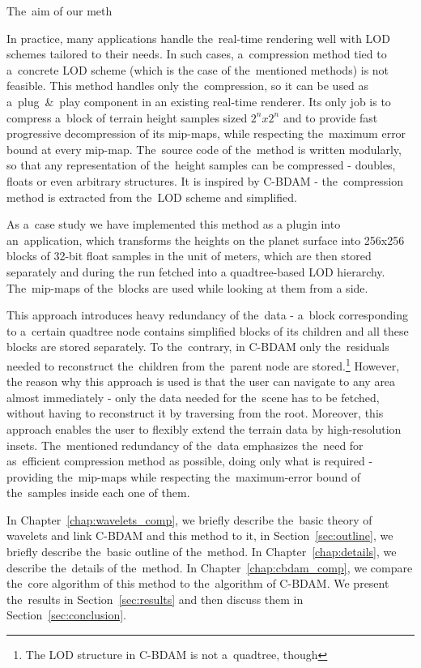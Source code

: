 The~aim of our meth

In practice, many applications handle the~real-time rendering well with LOD schemes tailored to their needs. In such cases, a~compression method tied to a~concrete LOD scheme (which is the case of the~mentioned methods) is not feasible. This method handles only the~compression, so it can be used as a~plug~\&~play component in an existing real-time renderer. Its only job is to compress a~block of terrain height samples sized $2^n x 2^n$ and to provide fast progressive decompression of its mip-maps, while respecting the~maximum error bound at every mip-map. The~source code of the~method is written modularly, so that any representation of the~height samples can be compressed - doubles, floats or even arbitrary structures. It is inspired by C-BDAM - the~compression method is extracted from the~LOD scheme and simplified.

As a~case study we have implemented this method as a plugin into an~application, which transforms the heights on the planet surface into 256x256 blocks of 32-bit float samples in the unit of meters, which are then stored separately and during the run fetched into a quadtree-based LOD hierarchy. The~mip-maps of the~blocks are used while looking at them from a side.

This approach introduces heavy redundancy of the~data - a~block corresponding to a~certain quadtree node contains simplified blocks of its children and all these blocks are stored separately. To the~contrary, in C-BDAM only the~residuals needed to reconstruct the~children from the~parent node are stored.\footnote{The LOD structure in C-BDAM is not a~quadtree, though} However, the reason why this approach is used is that the user can navigate to any area almost immediately - only the data needed for the~scene has to be fetched, without having to reconstruct it by traversing from the root. Moreover, this approach enables the user to flexibly extend the terrain data by high-resolution insets. The~mentioned redundancy of the~data emphasizes the~need for as~efficient compression method as possible, doing only what is required - providing the~mip-maps while respecting the~maximum-error bound of the~samples inside each one of them.

In Chapter~\ref{chap:wavelets_comp}, we briefly describe the~basic theory of wavelets and link C-BDAM and this method to it, in Section~\ref{sec:outline}, we briefly describe the~basic outline of the~method. In Chapter~\ref{chap:details}, we describe the~details of the~method. In Chapter~\ref{chap:cbdam_comp}, we compare the~core algorithm of this method to the~algorithm of C-BDAM. We present the~results in Section~\ref{sec:results} and then discuss them in Section~\ref{sec:conclusion}.
